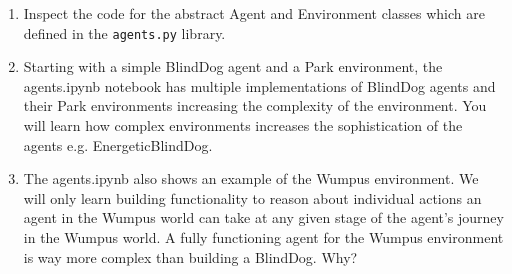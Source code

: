 \documentclass[11pt]{article}
\newcommand{\answer}[1]{}
\begin{document}
\begin{enumerate}
{\begin{enumerate}
\item Inspect the code for the abstract Agent and Environment classes which are defined in the \texttt{agents.py} library.
\item Starting with a simple BlindDog agent and a Park environment, the agents.ipynb notebook has multiple implementations of BlindDog agents and their Park environments increasing the complexity of the environment. You will learn how complex environments increases the sophistication of the agents e.g. EnergeticBlindDog.
\item The agents.ipynb also shows an example of the Wumpus environment. We will only learn building functionality to reason about individual actions an agent in the Wumpus world can take at any given stage of the agent's journey in the Wumpus world. A fully functioning agent for the Wumpus environment is way more complex than building a BlindDog. Why?
\end{enumerate}
}

\answer{
Follow the instructions in the aima-python code repository.
}

\end{enumerate} %
\end{document}
